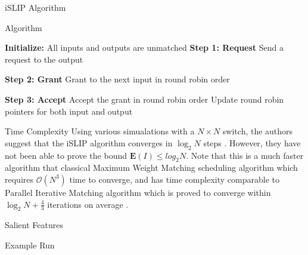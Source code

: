 \begin{section}{iSLIP Algorithm \cite{769767}}
    \begin{subsection}{Algorithm}
        \begin{algorithm}[h!]
            \caption{iSLIP Algorithm}
            \begin{algorithmic}[1]
                \State \textbf{Initialize:} All inputs and outputs are unmatched
                \Repeat
                    \State \textbf{Step 1: Request}
                            \State Send a request to the output
                        \EndFor
                    \EndFor
                    
                    \State \textbf{Step 2: Grant}
                            \State Grant to the next input in round robin order
                        \EndIf
                    \EndFor
                    
                    \State \textbf{Step 3: Accept}
                            \State Accept the grant in round robin order
                            \State Update round robin pointers for both input and output
                        \EndIf
                    \EndFor
            \end{algorithmic}
        \end{algorithm}
    \end{subsection}

    \begin{subsection}{Time Complexity}
        Using various simualations with a $N\times N$ switch, the authors suggest that the iSLIP algorithm converges in $\log_2 N$ steps \cite{1}. However, they have not been able to prove the bound $\mathbf{E}(I) \leq log_2 N$. 
        Note that this is a much faster algorithm that classical Maximum Weight Matching scheduling algorithm which requires $\mathcal{O}(N^3)$ time to converge, and has time complexity comparable to Parallel Iterative Matching algorithm which is proved to converge within $\log_2 N + \frac{4}{3}$ iterations on average \cite{1} .
    \end{subsection}

    \begin{subsection}{Salient Features}

    \end{subsection}

    \begin{subsection}{Example Run}

    \end{subsection}

\end{section}


